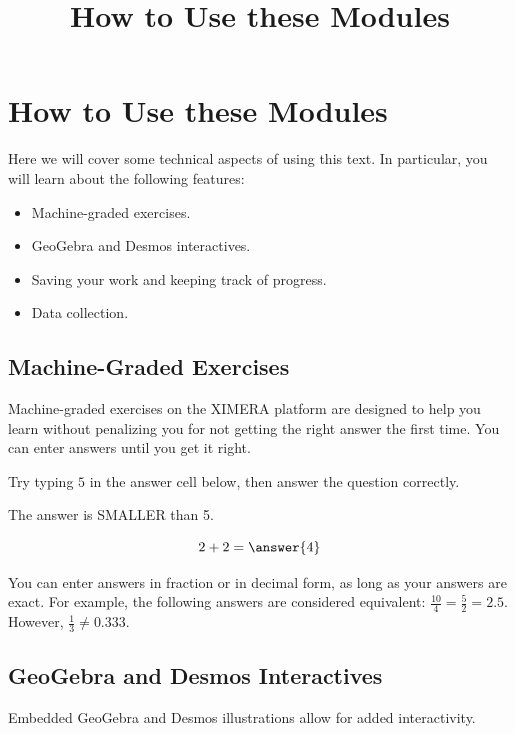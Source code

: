 \documentclass{ximera}
\title{How to Use these Modules} \license{CC BY-NC-SA 4.0}
\begin{document}
\begin{abstract}
\end{abstract}
\maketitle



\section*{How to Use these Modules}
Here we will cover some technical aspects of using this text.  In particular, you will learn about the following features:
\begin{itemize}
    \item Machine-graded exercises.
    \item GeoGebra and Desmos interactives.
    \item Saving your work and keeping track of progress.
    \item Data collection.
\end{itemize}

\subsection*{Machine-Graded Exercises}
Machine-graded exercises on the XIMERA platform are designed to help you learn without penalizing you for not getting the right answer the first time.  You can enter answers until you get it right.  
\begin{question}
Try typing $5$ in the answer cell below, then answer the question correctly.
\begin{hint} %
    The answer is SMALLER than 5.
\end{hint}
$$2+2=\answer{4}$$
\end{question}
You can enter answers in fraction or in decimal form, as long as your answers are exact.  For example, the following answers are considered equivalent: $\frac{10}{4}=\frac{5}{2}=2.5$.  However, $\frac{1}{3}\neq 0.333$.

\subsection*{GeoGebra and Desmos Interactives}
Embedded GeoGebra and Desmos illustrations allow for added interactivity.

\begin{onlineOnly}
\begin{center}
\end{center}
\end{onlineOnly}
\end{document}
